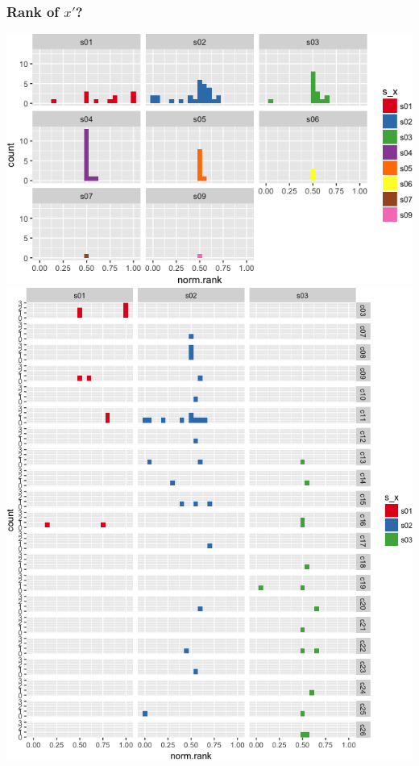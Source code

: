 \documentclass[]{article}
\begin{document}
\subsubsection{\texorpdfstring{Rank of
\(x'\)?}{Rank of x'?}}\label{rank-of-x-1}

\includegraphics{vn_files/figure-latex/rank3-1.png}
\includegraphics{vn_files/figure-latex/rank4-1.png}
\end{document}
